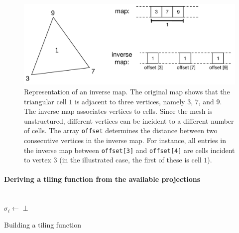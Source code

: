 \begin{figure}
\begin{CenteredBox}
\includegraphics[scale=0.7]{sparsetiling/figures/inverse_map}
\end{CenteredBox}
\caption{Representation of an inverse map. The original map shows that the triangular cell $1$ is adjacent to three vertices, namely $3$, $7$, and $9$. The inverse map associates vertices to cells. Since the mesh is unstructured, different vertices can be incident to a different number of cells. The array {\tt offset} determines the distance between two consecutive vertices in the inverse map. For instance, all entries in the inverse map between {\tt offset[3]} and {\tt offset[4]} are cells incident to vertex $3$ (in the illustrated case, the first of these is cell $1$).}
\label{fig:st-inverse-map}
\end{figure}


\paragraph{Deriving a tiling function from the available projections}

\begin{algorithm}[t]
\nonl ~\\
$\sigma_i \gets \perp$\;
\caption{Building a tiling function}
\label{algo:st-tiling}
\end{algorithm}

